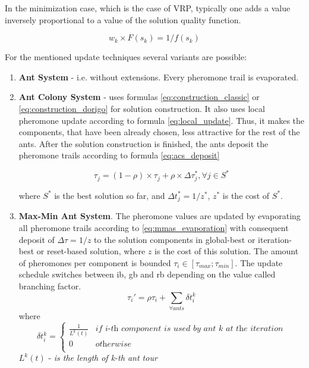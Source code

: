 \documentclass[11pt,a4paper,oneside]{book}
\begin{document}
In the minimization case, which is the case of VRP, typically one adds a value inversely proportional to a value of the solution quality function.

\begin{equation}
w_k \times F(s_k) = 1 / f(s_k)
\end{equation}


For the mentioned update techniques several variants are possible: \\

\begin{enumerate}
\item {\textbf{Ant System} - i.e. without extensions. Every pheromone trail is evaporated.}

\item {\textbf{Ant Colony System} - uses formulas \eqref{eq:construction_classic} or \eqref{eq:construction_dorigo} for solution construction. It also uses local pheromone update according to formula \eqref{eq:local_update}. Thus, it makes the components, that have been already chosen, less attractive for the rest of the ants. After the solution construction is finished, the ants deposit the pheromone trails according to formula \eqref{eq:acs_deposit}}

\begin{equation}
\tau_j = (1 - \rho) \times \tau_j + \rho \times \Delta \tau_j^*, \forall j \in S^*
\label{eq:acs_deposit}
\end{equation}

where $S^*$ is the best solution so far, and $\Delta t_j^* = 1/z^*$, $z^*$ is the cost of $S^*$.

\item \textbf{Max-Min Ant System}. The pheromone values are updated by evaporating all pheromone trails according to \eqref{eq:mmas_evaporation} with consequent deposit of $\Delta \tau = 1 / z$ to the solution components in global-best or iteration-best or reset-based solution, where $z$ is the cost of this solution. The amount of pheromones per component is bounded $\tau_i \in [\tau_{max};\tau_{min}]$. The update schedule switches between ib, gb and rb depending on the value called branching factor.
\begin{equation}
\tau_i' = \rho \tau_i + \sum \limits_{\forall ants} \delta t_i^k
\end{equation}
where
\[
\delta t_i^k =
\left\{
\begin{array}{ll}
      \frac{1}{L^k(t)} & \textit{if i-th component is used by ant k at the iteration}\\
      0 & \textit{otherwise} \\
\end{array} 
\right. 
\]
$L^k(t)$ - \textit{is the length of k-th ant tour}



\end{enumerate}
\end{document}
